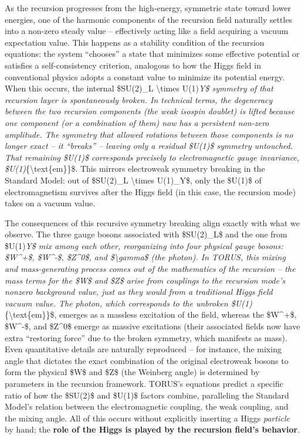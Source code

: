 \documentclass[]{article}
\begin{document}
As the recursion progresses from the high-energy, symmetric state toward
lower energies, one of the harmonic components of the recursion field
naturally settles into a non-zero steady value -- effectively acting
like a field acquiring a vacuum expectation value​. This happens as a
stability condition of the recursion equations: the system ``chooses'' a
state that minimizes some effective potential or satisfies a
self-consistency criterion, analogous to how the Higgs field in
conventional physics adopts a constant value to minimize its potential
energy​. When this occurs, the internal \$SU(2)\_L \textbackslash{}times
U(1)\emph{Y\$ symmetry of that recursion layer is spontaneously broken.
In technical terms, the degeneracy between the two recursion components
(the weak isospin doublet) is lifted because one component (or a
combination of them) now has a persistent non-zero amplitude. The
symmetry that allowed rotations between those components is no longer
exact -- it ``breaks'' -- leaving only a residual \$U(1)\$ symmetry
untouched. That remaining \$U(1)\$ corresponds precisely to
electromagnetic gauge invariance,
\$U(1)}\{\textbackslash{}text\{em\}\}\$​. This mirrors electroweak
symmetry breaking in the Standard Model: out of \$SU(2)\_L
\textbackslash{}times U(1)\_Y\$, only the \$U(1)\$ of electromagnetism
survives after the Higgs field (in this case, the recursion mode) takes
on a vacuum value.

The consequences of this recursive symmetry breaking align exactly with
what we observe. The three gauge bosons associated with \$SU(2)\_L\$ and
the one from \$U(1)\emph{Y\$ mix among each other, reorganizing into
four physical gauge bosons: \$W\^{}+\$, \$W\^{}-\$, \$Z\^{}0\$, and
\$\textbackslash{}gamma\$ (the photon)​. In TORUS, this mixing and
mass-generating process comes out of the mathematics of the recursion --
the mass terms for the \$W\$ and \$Z\$ arise from couplings to the
recursion mode's nonzero background value, just as they would from a
traditional Higgs field vacuum value. The photon, which corresponds to
the unbroken \$U(1)}\{\textbackslash{}text\{em\}\}\$, emerges as a
massless excitation of the field, whereas the \$W\^{}+\$, \$W\^{}-\$,
and \$Z\^{}0\$ emerge as massive excitations (their associated fields
now have extra ``restoring force'' due to the broken symmetry, which
manifests as mass)​. Even quantitative details are naturally reproduced
-- for instance, the mixing angle that dictates the exact combination of
the original electroweak bosons to form the physical \$W\$ and \$Z\$
(the Weinberg angle) is determined by parameters in the recursion
framework​. TORUS's equations predict a specific ratio of how the
\$SU(2)\$ and \$U(1)\$ factors combine, paralleling the Standard Model's
relation between the electromagnetic coupling, the weak coupling, and
the mixing angle​. All of this occurs without explicitly inserting a
Higgs \emph{particle} by hand; the \textbf{role of the Higgs is played
by the recursion field's behavior}.
\end{document}
